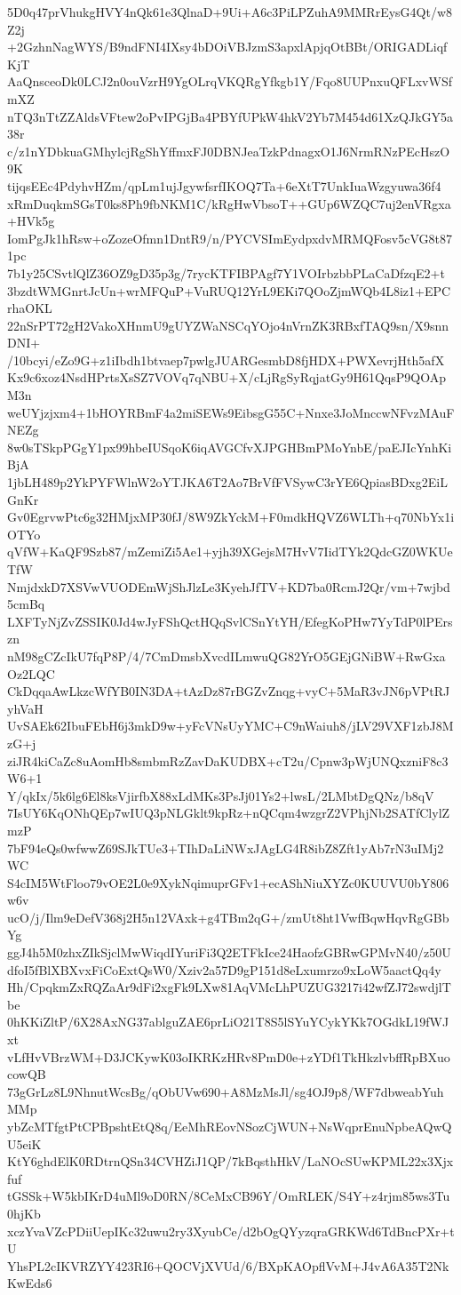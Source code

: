5D0q47prVhukgHVY4nQk61e3QlnaD+9Ui+A6c3PiLPZuhA9MMRrEysG4Qt/w8Z2j
+2GzhnNagWYS/B9ndFNI4IXsy4bDOiVBJzmS3apxlApjqOtBBt/ORIGADLiqfKjT
AaQnsceoDk0LCJ2n0ouVzrH9YgOLrqVKQRgYfkgb1Y/Fqo8UUPnxuQFLxvWSfmXZ
nTQ3nTtZZAldsVFtew2oPvIPGjBa4PBYfUPkW4hkV2Yb7M454d61XzQJkGY5a38r
c/z1nYDbkuaGMhylcjRgShYffmxFJ0DBNJeaTzkPdnagxO1J6NrmRNzPEcHszO9K
tijqsEEc4PdyhvHZm/qpLm1ujJgywfsrfIKOQ7Ta+6eXtT7UnkIuaWzgyuwa36f4
xRmDuqkmSGsT0ks8Ph9fbNKM1C/kRgHwVbsoT++GUp6WZQC7uj2enVRgxa+HVk5g
IomPgJk1hRsw+oZozeOfmn1DntR9/n/PYCVSImEydpxdvMRMQFosv5cVG8t871pc
7b1y25CSvtlQlZ36OZ9gD35p3g/7rycKTFIBPAgf7Y1VOIrbzbbPLaCaDfzqE2+t
3bzdtWMGnrtJcUn+wrMFQuP+VuRUQ12YrL9EKi7QOoZjmWQb4L8iz1+EPCrhaOKL
22nSrPT72gH2VakoXHnmU9gUYZWaNSCqYOjo4nVrnZK3RBxfTAQ9sn/X9snnDNI+
/10bcyi/eZo9G+z1iIbdh1btvaep7pwlgJUARGesmbD8fjHDX+PWXevrjHth5afX
Kx9c6xoz4NsdHPrtsXsSZ7VOVq7qNBU+X/cLjRgSyRqjatGy9H61QqsP9QOApM3n
weUYjzjxm4+1bHOYRBmF4a2miSEWs9EibsgG55C+Nnxe3JoMnccwNFvzMAuFNEZg
8w0sTSkpPGgY1px99hbeIUSqoK6iqAVGCfvXJPGHBmPMoYnbE/paEJIcYnhKiBjA
1jbLH489p2YkPYFWlnW2oYTJKA6T2Ao7BrVfFVSywC3rYE6QpiasBDxg2EiLGnKr
Gv0EgrvwPtc6g32HMjxMP30fJ/8W9ZkYckM+F0mdkHQVZ6WLTh+q70NbYx1iOTYo
qVfW+KaQF9Szb87/mZemiZi5Ae1+yjh39XGejsM7HvV7IidTYk2QdcGZ0WKUeTfW
NmjdxkD7XSVwVUODEmWjShJlzLe3KyehJfTV+KD7ba0RcmJ2Qr/vm+7wjbd5cmBq
LXFTyNjZvZSSIK0Jd4wJyFShQctHQqSvlCSnYtYH/EfegKoPHw7YyTdP0lPErszn
nM98gCZcIkU7fqP8P/4/7CmDmsbXvcdILmwuQG82YrO5GEjGNiBW+RwGxaOz2LQC
CkDqqaAwLkzcWfYB0IN3DA+tAzDz87rBGZvZnqg+vyC+5MaR3vJN6pVPtRJyhVaH
UvSAEk62IbuFEbH6j3mkD9w+yFcVNsUyYMC+C9nWaiuh8/jLV29VXF1zbJ8MzG+j
ziJR4kiCaZc8uAomHb8smbmRzZavDaKUDBX+cT2u/Cpnw3pWjUNQxzniF8c3W6+1
Y/qkIx/5k6lg6El8ksVjirfbX88xLdMKs3PsJj01Ys2+lwsL/2LMbtDgQNz/b8qV
7IsUY6KqONhQEp7wIUQ3pNLGklt9kpRz+nQCqm4wzgrZ2VPhjNb2SATfClylZmzP
7bF94eQs0wfwwZ69SJkTUe3+TIhDaLiNWxJAgLG4R8ibZ8Zft1yAb7rN3uIMj2WC
S4cIM5WtFloo79vOE2L0e9XykNqimuprGFv1+ecAShNiuXYZc0KUUVU0bY806w6v
ucO/j/Ilm9eDefV368j2H5n12VAxk+g4TBm2qG+/zmUt8ht1VwfBqwHqvRgGBbYg
ggJ4h5M0zhxZIkSjclMwWiqdIYuriFi3Q2ETFkIce24HaofzGBRwGPMvN40/z50U
dfoI5fBlXBXvxFiCoExtQsW0/Xziv2a57D9gP151d8eLxumrzo9xLoW5aactQq4y
Hh/CpqkmZxRQZaAr9dFi2xgFk9LXw81AqVMcLhPUZUG3217i42wfZJ72swdjlTbe
0hKKiZltP/6X28AxNG37ablguZAE6prLiO21T8S5lSYuYCykYKk7OGdkL19fWJxt
vLfHvVBrzWM+D3JCKywK03oIKRKzHRv8PmD0e+zYDf1TkHkzlvbffRpBXuocowQB
73gGrLz8L9NhnutWcsBg/qObUVw690+A8MzMsJl/sg4OJ9p8/WF7dbweabYuhMMp
ybZcMTfgtPtCPBpshtEtQ8q/EeMhREovNSozCjWUN+NsWqprEnuNpbeAQwQU5eiK
KtY6ghdElK0RDtrnQSn34CVHZiJ1QP/7kBqsthHkV/LaNOcSUwKPML22x3Xjxfuf
tGSSk+W5kbIKrD4uMl9oD0RN/8CeMxCB96Y/OmRLEK/S4Y+z4rjm85ws3Tu0hjKb
xczYvaVZcPDiiUepIKc32uwu2ry3XyubCe/d2bOgQYyzqraGRKWd6TdBncPXr+tU
YhsPL2cIKVRZYY423RI6+QOCVjXVUd/6/BXpKAOpflVvM+J4vA6A35T2NkKwEds6
